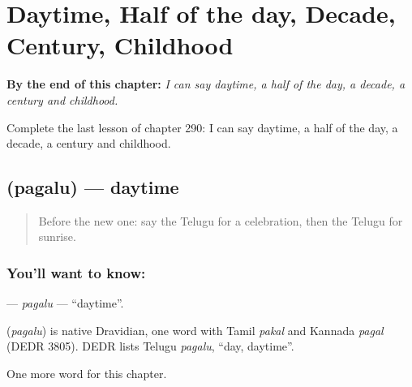 
\chapter{Daytime, Half of the day, Decade, Century, Childhood}
\label{ch:te-daytime-half-of-the-day-decade-century-childhood}

\begin{chapteropening}
\textbf{By the end of this chapter:} \emph{I can say daytime, a half of the day, a decade, a century and childhood.}

Complete the last lesson of chapter 290: I can say daytime, a half of the day, a decade, a century and childhood.
\end{chapteropening}

\section[\texorpdfstring{\te{పగలు} (pagalu)}{పగలు (pagalu)}]{ (pagalu) — daytime}

\label{lesson:TE-C290-pagalu}



\begin{quote}
Before the new one: say the Telugu for a celebration, then the Telugu for sunrise.
\end{quote}

\subsection*{You'll want to know: }
\textbf{} — \emph{pagalu} — \textquotedblleft{}daytime\textquotedblright{}.

\begin{cousinweb}
\textbf{} (\emph{pagalu}) is native Dravidian, one word with Tamil \emph{pakal} and Kannada \emph{pagal} (DEDR 3805). DEDR lists Telugu \emph{pagalu}, \textquotedblleft{}day, daytime\textquotedblright{}.
\end{cousinweb}

\begin{grammarlens}[title={What you've built}]
One more word for this chapter.
\end{grammarlens}

